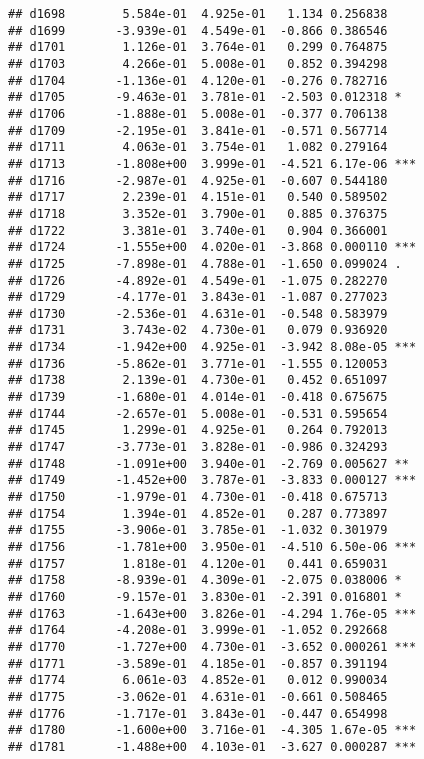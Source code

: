 \documentclass[
]{article}
\begin{document}
\begin{verbatim}
## d1698        5.584e-01  4.925e-01   1.134 0.256838    
## d1699       -3.939e-01  4.549e-01  -0.866 0.386546    
## d1701        1.126e-01  3.764e-01   0.299 0.764875    
## d1703        4.266e-01  5.008e-01   0.852 0.394298    
## d1704       -1.136e-01  4.120e-01  -0.276 0.782716    
## d1705       -9.463e-01  3.781e-01  -2.503 0.012318 *  
## d1706       -1.888e-01  5.008e-01  -0.377 0.706138    
## d1709       -2.195e-01  3.841e-01  -0.571 0.567714    
## d1711        4.063e-01  3.754e-01   1.082 0.279164    
## d1713       -1.808e+00  3.999e-01  -4.521 6.17e-06 ***
## d1716       -2.987e-01  4.925e-01  -0.607 0.544180    
## d1717        2.239e-01  4.151e-01   0.540 0.589502    
## d1718        3.352e-01  3.790e-01   0.885 0.376375    
## d1722        3.381e-01  3.740e-01   0.904 0.366001    
## d1724       -1.555e+00  4.020e-01  -3.868 0.000110 ***
## d1725       -7.898e-01  4.788e-01  -1.650 0.099024 .  
## d1726       -4.892e-01  4.549e-01  -1.075 0.282270    
## d1729       -4.177e-01  3.843e-01  -1.087 0.277023    
## d1730       -2.536e-01  4.631e-01  -0.548 0.583979    
## d1731        3.743e-02  4.730e-01   0.079 0.936920    
## d1734       -1.942e+00  4.925e-01  -3.942 8.08e-05 ***
## d1736       -5.862e-01  3.771e-01  -1.555 0.120053    
## d1738        2.139e-01  4.730e-01   0.452 0.651097    
## d1739       -1.680e-01  4.014e-01  -0.418 0.675675    
## d1744       -2.657e-01  5.008e-01  -0.531 0.595654    
## d1745        1.299e-01  4.925e-01   0.264 0.792013    
## d1747       -3.773e-01  3.828e-01  -0.986 0.324293    
## d1748       -1.091e+00  3.940e-01  -2.769 0.005627 ** 
## d1749       -1.452e+00  3.787e-01  -3.833 0.000127 ***
## d1750       -1.979e-01  4.730e-01  -0.418 0.675713    
## d1754        1.394e-01  4.852e-01   0.287 0.773897    
## d1755       -3.906e-01  3.785e-01  -1.032 0.301979    
## d1756       -1.781e+00  3.950e-01  -4.510 6.50e-06 ***
## d1757        1.818e-01  4.120e-01   0.441 0.659031    
## d1758       -8.939e-01  4.309e-01  -2.075 0.038006 *  
## d1760       -9.157e-01  3.830e-01  -2.391 0.016801 *  
## d1763       -1.643e+00  3.826e-01  -4.294 1.76e-05 ***
## d1764       -4.208e-01  3.999e-01  -1.052 0.292668    
## d1770       -1.727e+00  4.730e-01  -3.652 0.000261 ***
## d1771       -3.589e-01  4.185e-01  -0.857 0.391194    
## d1774        6.061e-03  4.852e-01   0.012 0.990034    
## d1775       -3.062e-01  4.631e-01  -0.661 0.508465    
## d1776       -1.717e-01  3.843e-01  -0.447 0.654998    
## d1780       -1.600e+00  3.716e-01  -4.305 1.67e-05 ***
## d1781       -1.488e+00  4.103e-01  -3.627 0.000287 ***

\end{verbatim}
\end{document}

